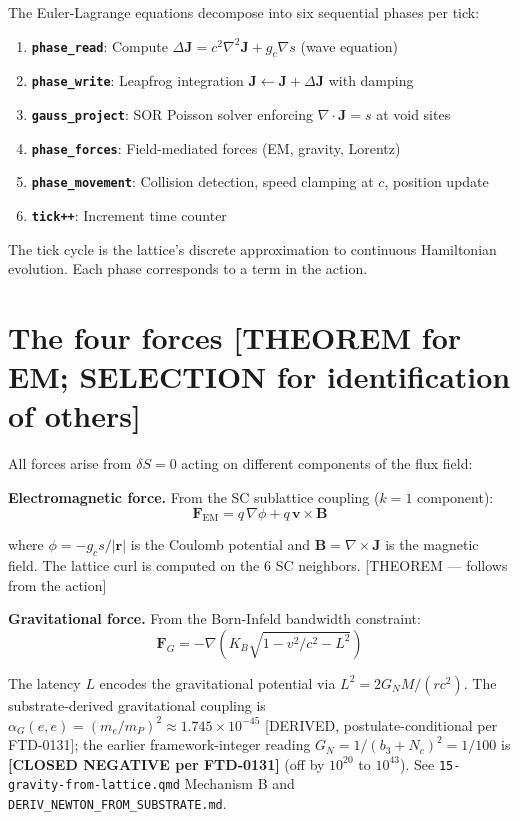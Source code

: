 \documentclass[
  11pt,
  letterpaper,
  twoside,
  openany]{book}
\makeatletter
\providecommand{\tightlist}{%
  \setlength{\itemsep}{0pt}\setlength{\parskip}{0pt}}
\let\orig@section\section
\renewcommand{\section}{\needspace{8\baselineskip}\orig@section}
\makeatother
\begin{document}
The Euler-Lagrange equations decompose into six sequential phases per
tick:

\begin{enumerate}
\def\labelenumi{\arabic{enumi}.}
\tightlist
\item
  \textbf{\texttt{phase\_read}}: Compute
  \(\Delta \mathbf{J} = c^2 \nabla^2 \mathbf{J} + g_c \nabla s\) (wave
  equation)
\item
  \textbf{\texttt{phase\_write}}: Leapfrog integration
  \(\mathbf{J} \leftarrow \mathbf{J} + \Delta \mathbf{J}\) with damping
\item
  \textbf{\texttt{gauss\_project}}: SOR Poisson solver enforcing
  \(\nabla \cdot \mathbf{J} = s\) at void sites
\item
  \textbf{\texttt{phase\_forces}}: Field-mediated forces (EM, gravity,
  Lorentz)
\item
  \textbf{\texttt{phase\_movement}}: Collision detection, speed clamping
  at \(c\), position update
\item
  \textbf{\texttt{tick++}}: Increment time counter
\end{enumerate}

The tick cycle is the lattice's discrete approximation to continuous
Hamiltonian evolution. Each phase corresponds to a term in the action.

\section{The four forces {[}THEOREM for EM; SELECTION for identification
of
others{]}}\label{the-four-forces-theorem-for-em-selection-for-identification-of-others}

All forces arise from \(\delta S = 0\) acting on different components of
the flux field:

\textbf{Electromagnetic force.} From the SC sublattice coupling
(\(k = 1\) component): \[
\mathbf{F}_{\text{EM}} = q \, \nabla \phi + q \, \mathbf{v} \times \mathbf{B}
\tag{14.8}
\]

where \(\phi = -g_c s / |\mathbf{r}|\) is the Coulomb potential and
\(\mathbf{B} = \nabla \times \mathbf{J}\) is the magnetic field. The
lattice curl is computed on the 6 SC neighbors. {[}THEOREM --- follows
from the action{]}

\textbf{Gravitational force.} From the Born-Infeld bandwidth constraint:
\[
\mathbf{F}_G = -\nabla \left( K_B \sqrt{1 - v^2/c^2 - L^2} \right)
\tag{14.9}
\]

The latency \(L\) encodes the gravitational potential via
\(L^2 = 2G_N M / (rc^2)\). The substrate-derived gravitational coupling
is \(\alpha_G(e,e) = (m_e/m_P)^2 \approx 1.745 \times 10^{-45}\)
{[}DERIVED, postulate-conditional per FTD-0131{]}; the earlier
framework-integer reading \(G_N = 1/(b_3+N_c)^2 = 1/100\) is
\textbf{{[}CLOSED NEGATIVE per FTD-0131{]}} (off by \(10^{20}\) to
\(10^{43}\)). See \texttt{15-gravity-from-lattice.qmd} Mechanism B and
\texttt{DERIV\_NEWTON\_FROM\_SUBSTRATE.md}.
\end{document}
